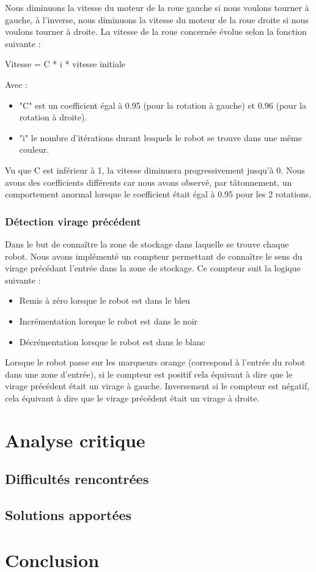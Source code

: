 \documentclass[french,a4paper,12pt]{report}
\begin{document}
Nous diminuons la vitesse du moteur de la roue gauche si nous voulons tourner à gauche, à l’inverse, nous diminuons la vitesse du moteur de la roue droite si nous voulons tourner à droite. La vitesse de la roue concernée évolue selon la fonction suivante :

Vitesse = C * i * vitesse initiale

Avec :
\begin{itemize}
\item "C" est un coefficient égal à 0.95 (pour la rotation à gauche) et 0.96 (pour la rotation à droite).

\item "i" le nombre d’itérations durant lesquels le robot se trouve dans une même couleur.
\end{itemize}

Vu que C est inférieur à 1, la vitesse diminuera progressivement jusqu’à 0.
Nous avons des coefficients différents car nous avons observé, par tâtonnement, un comportement anormal lorsque le coefficient était égal à 0.95 pour les 2 rotations.

\section{Détection virage précédent}
Dans le but de connaître la zone de stockage dans laquelle se trouve chaque robot. Nous avons implémenté un compteur permettant de connaître le sens du virage précédant l’entrée dans la zone de stockage.
Ce compteur suit la logique suivante :
\begin{itemize}
\item Remis à zéro lorsque le robot est dans le bleu

\item Incrémentation lorsque le robot est dans le noir

\item Décrémentation lorsque le robot est dans le blanc
\end{itemize}

Lorsque le robot passe sur les marqueurs orange (correspond à l’entrée du robot dans une zone d’entrée), si le compteur est positif cela équivaut à dire que le virage précédent était un virage à gauche. Inversement si le compteur est négatif, cela équivaut à dire que le virage précédent était un virage à droite.

\part{Analyse critique}

\chapter{Difficultés rencontrées}

\chapter{Solutions apportées}

\part{Conclusion}
\end{document}
